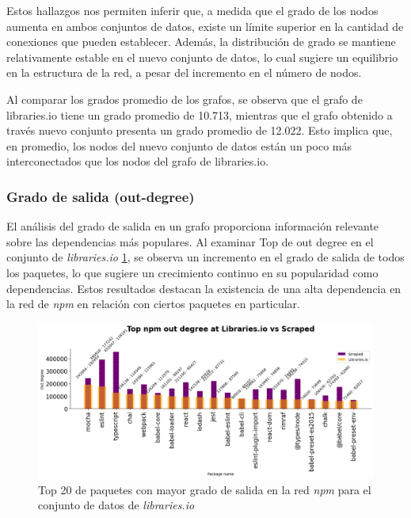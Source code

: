Estos hallazgos nos permiten inferir que, a medida que el grado de los nodos aumenta en ambos conjuntos de datos,
existe un límite superior en la cantidad de conexiones que pueden establecer. Además, la distribución
de grado se mantiene relativamente estable en el nuevo conjunto de datos, lo cual sugiere un equilibrio
en la estructura de la red, a pesar del incremento en el número de nodos.

Al comparar los grados promedio de los grafos, se observa que el grafo de libraries.io tiene un grado promedio de 10.713,
mientras que el grafo obtenido a través nuevo conjunto presenta un grado promedio de 12.022. Esto implica que, en promedio,
los nodos del nuevo conjunto de datos están un poco más interconectados que los nodos del grafo de libraries.io.



\subsubsection{Grado de salida (out-degree)}

El análisis del grado de salida en un grafo proporciona información relevante sobre las dependencias más populares.
Al examinar Top de out degree en el conjunto de \textit{libraries.io} \ref{fig:npm_outd_libraries}, se observa un incremento en el grado de salida de todos los paquetes,
lo que sugiere un crecimiento continuo en su popularidad como dependencias. Estos resultados destacan la existencia de
una alta dependencia en la red de \textit{npm} en relación con ciertos paquetes en particular.

\begin{figure}[ht!]
    \begin{center}
        \includegraphics[width=1\textwidth]{img/npm/outd-ls.png}
        \caption{Top 20 de paquetes con mayor grado de salida en la red \textit{npm} para el conjunto de datos de \textit{libraries.io}}
    \end{center}
    \label{fig:npm_outd_libraries}
\end{figure}

